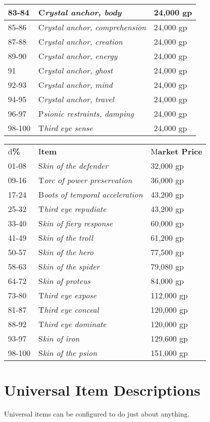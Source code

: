 \documentclass{article}
\begin{document}
\begin{tabular}{|>{\raggedright}p{28pt}|>{\raggedright}p{141pt}|>{\raggedright}p{55pt}|}
\hline
83-84 & C\textit{rystal anchor, body} & 24,000 gp\tabularnewline
\hline
85-86 & C\textit{rystal anchor, comprehension} & 24,000 gp\tabularnewline
\hline
87-88 & C\textit{rystal anchor, creation} & 24,000 gp\tabularnewline
\hline
89-90 & C\textit{rystal anchor, energy} & 24,000 gp\tabularnewline
\hline
91 & C\textit{rystal anchor, ghost} & 24,000 gp\tabularnewline
\hline
92-93 & C\textit{rystal anchor, mind} & 24,000 gp\tabularnewline
\hline
94-95 & C\textit{rystal anchor, travel} & 24,000 gp\tabularnewline
\hline
96-97 & P\textit{sionic restraints, damping} & 24,000 gp\tabularnewline
\hline
98-100 & T\textit{hird eye sense} & 24,000 gp\tabularnewline
\hline
\end{tabular}

\vspace{12pt}
\begin{tabular}{|>{\raggedright}p{28pt}|>{\raggedright}p{122pt}|>{\raggedright}p{55pt}|}
\hline
\multicolumn{3}{|p{207pt}|}{T\textbf{able: Major Universal Items}}\tabularnewline
\hline
d\textbf{\%} & I\textbf{tem} & M\textbf{arket Price}\tabularnewline
\hline
01-08 & S\textit{kin of the defender} & 32,000 gp\tabularnewline
\hline
09-16 & T\textit{orc of power preservation} & 36,000 gp\tabularnewline
\hline
17-24 & B\textit{oots of temporal acceleration} & 43,200 gp\tabularnewline
\hline
25-32 & T\textit{hird eye repudiate} & 43,200 gp\tabularnewline
\hline
33-40 & S\textit{kin of fiery response} & 60,000 gp\tabularnewline
\hline
41-49 & S\textit{kin of the troll} & 61,200 gp\tabularnewline
\hline
50-57 & S\textit{kin of the hero} & 77,500 gp\tabularnewline
\hline
58-63 & S\textit{kin of the spider} & 79,080 gp\tabularnewline
\hline
64-72 & S\textit{kin of proteus} & 84,000 gp\tabularnewline
\hline
73-80 & T\textit{hird eye expose} & 112,000 gp\tabularnewline
\hline
81-87 & T\textit{hird eye conceal} & 120,000 gp\tabularnewline
\hline
88-92 & T\textit{hird eye dominate} & 120,000 gp\tabularnewline
\hline
93-97 & S\textit{kin of iron} & 129,600 gp\tabularnewline
\hline
98-100 & S\textit{kin of the psion} & 151,000 gp\tabularnewline
\hline
\end{tabular}

\vspace{12pt}
\section*{\textbf{Universal Item Descriptions}}

Universal items can be configured to do just about anything. 
\end{document}
